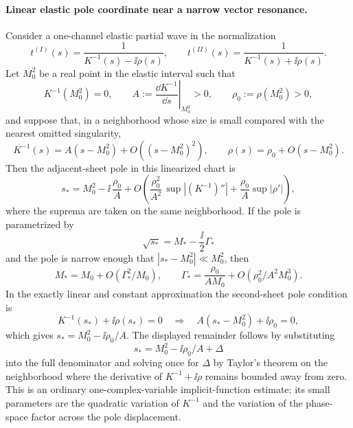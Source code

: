 \paragraph{Linear elastic pole coordinate near a narrow vector resonance.}
Consider a one-channel elastic partial wave in the normalization
\[
  t^{(I)}(s)=\frac{1}{K^{-1}(s)-\ii\rho(s)},
  \qquad
  t^{(II)}(s)=\frac{1}{K^{-1}(s)+\ii\rho(s)}.
\]
Let \(M_0^2\) be a real point in the elastic interval such that
\[
  K^{-1}(M_0^2)=0,\qquad
  A:=\left.\frac{\dd K^{-1}}{\dd s}\right|_{M_0^2}>0,
  \qquad
  \rho_0:=\rho(M_0^2)>0,
\]
and suppose that, in a neighborhood whose size is small compared with the
nearest omitted singularity,
\[
  K^{-1}(s)=A(s-M_0^2)+O((s-M_0^2)^2),
  \qquad
  \rho(s)=\rho_0+O(s-M_0^2).
\]
Then the adjacent-sheet pole in this linearized chart is
\begin{equation}
  s_\ast=M_0^2-\ii\,\frac{\rho_0}{A}
  +O\!\left(\frac{\rho_0^2}{A^2}\,
  \sup |(K^{-1})''|+\frac{\rho_0}{A}\sup|\rho'|\right),
  \label{eq:qcd-linear-elastic-pole-coordinate}
\end{equation}
where the suprema are taken on the same neighborhood.  If the pole is
parametrized by
\[
  \sqrt{s_\ast}=M_\ast-\frac{\ii}{2}\Gamma_\ast
\]
and the pole is narrow enough that
\(|s_\ast-M_0^2|\ll M_0^2\), then
\begin{equation}
  M_\ast=M_0+O(\Gamma_\ast^2/M_0),
  \qquad
  \Gamma_\ast=\frac{\rho_0}{A M_0}
  +O(\rho_0^2/A^2M_0^3).
  \label{eq:qcd-linear-elastic-width-coordinate}
\end{equation}
In the exactly linear and constant approximation the second-sheet pole
condition is
\[
  K^{-1}(s_\ast)+\ii\rho(s_\ast)=0
  \quad\Longrightarrow\quad
  A(s_\ast-M_0^2)+\ii\rho_0=0,
\]
which gives \(s_\ast=M_0^2-\ii\rho_0/A\).  The displayed remainder follows
by substituting
\[
  s_\ast=M_0^2-\ii\rho_0/A+\Delta
\]
into the full denominator and solving once for \(\Delta\) by Taylor's theorem
on the neighborhood where the derivative of
\(K^{-1}+\ii\rho\) remains bounded away from zero.  This is an ordinary
one-complex-variable implicit-function estimate; its small parameters are
the quadratic variation of \(K^{-1}\) and the variation of the phase-space
factor across the pole displacement.

